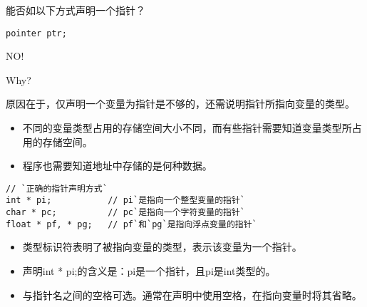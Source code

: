 \begin{frame}[fragile]
能否如以下方式声明一个指针？
\begin{lstlisting}[backgroundcolor=\color{blue!10}]
pointer ptr;
\end{lstlisting}
\pause \vspace{0.1in}

\begin{center}
{\Large NO!}
\end{center}
\pause\vspace{0.1in}

\begin{center}
{\Large Why?} 
\end{center}
\end{frame}

\begin{frame}[fragile]
原因在于，仅声明一个变量为指针是不够的，还需说明指针所指向变量的类型。
\vspace{0.1in}

\begin{itemize}
\item 不同的变量类型占用的存储空间大小不同，而有些指针需要知道变量类型所占用的存储空间。\\[0.1in]
\item 程序也需要知道地址中存储的是何种数据。
\end{itemize}
\end{frame}

\begin{frame}[fragile]
  \begin{lstlisting}[backgroundcolor=\color{blue!10}]
// `正确的指针声明方式`    
int * pi;           // pi`是指向一个整型变量的指针`
char * pc;          // pc`是指向一个字符变量的指针`
float * pf, * pg;   // pf`和`pg`是指向浮点变量的指针`
\end{lstlisting} \pause \vspace{0.1in}

\begin{itemize}
\item
类型标识符表明了被指向变量的类型，{\tf *}表示该变量为一个指针。\\[0.1in]
\item 
声明{\tf int * pi;}的含义是：{\tf pi}是一个指针，且{\tf *pi}是{\tf int}类型的。\\[0.1in]
\item 
{\tf *}与指针名之间的空格可选。通常在声明中使用空格，在指向变量时将其省略。
\end{itemize}
\end{frame}

